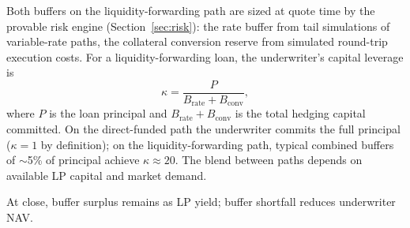 Both buffers on the liquidity-forwarding path are sized at quote time by the provable risk engine (Section~\ref{sec:risk}): the rate buffer from tail simulations of variable-rate paths, the collateral conversion reserve from simulated round-trip execution costs. For a liquidity-forwarding loan, the underwriter's capital leverage is
\begin{equation}
  \kappa = \frac{P}{B_{\mathrm{rate}} + B_{\mathrm{conv}}},
  \label{eq:leverage}
\end{equation}
where $P$ is the loan principal and $B_{\mathrm{rate}} + B_{\mathrm{conv}}$ is the total hedging capital committed. On the direct-funded path the underwriter commits the full principal ($\kappa = 1$ by definition); on the liquidity-forwarding path, typical combined buffers of ${\sim}$5\% of principal achieve $\kappa \approx 20$. The blend between paths depends on available LP capital and market demand.

At close, buffer surplus remains as LP yield; buffer shortfall reduces underwriter NAV.
